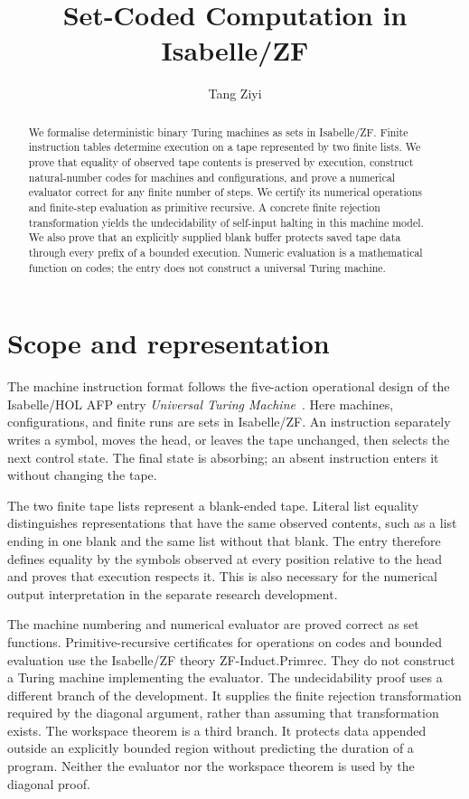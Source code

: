 \documentclass[11pt,a4paper]{article}
\begin{document}
\title{Set-Coded Computation in Isabelle/ZF}
\author{Tang Ziyi}
\maketitle

\begin{abstract}
We formalise deterministic binary Turing machines as sets in Isabelle/ZF.
Finite instruction tables determine execution on a tape represented by two
finite lists. We prove that equality of observed tape contents is preserved
by execution, construct natural-number codes for machines and configurations,
and prove a numerical evaluator correct for any finite number of steps.
We certify its numerical operations and finite-step evaluation as
primitive recursive.
A concrete finite rejection transformation yields the undecidability of
self-input halting in this machine model. We also prove that an explicitly
supplied blank buffer protects saved tape data through every prefix of a
bounded execution. Numeric evaluation is a mathematical function on codes;
the entry does not construct a universal Turing machine.
\end{abstract}

\tableofcontents

\section{Scope and representation}
The machine instruction format follows the five-action operational design of
the Isabelle/HOL AFP entry \emph{Universal Turing Machine}~\cite{afp-utm}.
Here machines, configurations, and finite runs are sets in Isabelle/ZF.
An instruction separately writes a symbol, moves the head, or leaves the tape
unchanged, then selects the next control state. The final state is absorbing;
an absent instruction enters it without changing the tape.

The two finite tape lists represent a blank-ended tape. Literal list equality
distinguishes representations that have the same observed contents, such as a
list ending in one blank and the same list without that blank. The entry
therefore defines equality by the symbols observed at every position relative
to the head and proves that execution respects it. This is also necessary for
the numerical output interpretation in the separate research development.

The machine numbering and numerical evaluator are proved correct as set
functions. Primitive-recursive certificates for operations on codes and
bounded evaluation use the Isabelle/ZF theory ZF-Induct.Primrec. They do not
construct a Turing machine implementing the evaluator. The undecidability
proof uses a different branch of the development. It supplies the finite
rejection transformation required by the diagonal argument, rather than
assuming that transformation exists. The workspace theorem is a third
branch. It protects data appended outside an explicitly bounded region
without predicting the duration of a program. Neither the evaluator nor
the workspace theorem is used by the diagonal proof.
\end{document}
